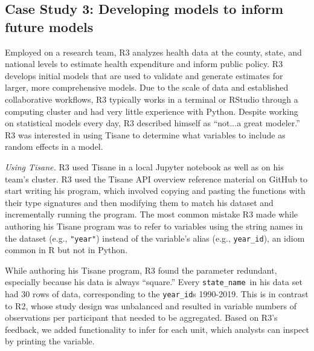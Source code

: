 \subsection{Case Study 3: Developing models to inform future models}
Employed on a research team, R3 analyzes health data at the county, state,
and national levels to estimate health expenditure and inform public policy. R3
develops initial models that are used to validate and generate estimates for
larger, more comprehensive models.
Due to the
scale of data and established collaborative workflows, R3 typically works in a
terminal or RStudio through a computing cluster and had very little experience
with Python. Despite working on statistical models every day, R3 described himself as
``not...a great modeler.''
R3 was interested in using Tisane to
determine what variables to include as random effects in a model.

\def\statename{\texttt{state\_name}\xspace}
\def\yearid{\texttt{year\_id}\xspace}
\def\cardinality{\texttt{cardinality}\xspace}

\textit{Using Tisane.} R3 used Tisane in a local Jupyter notebook as well as on
his team's cluster. R3 used the Tisane API overview reference material on GitHub
to start writing his program, which involved copying and pasting the functions
with their type signatures and then modifying them to match his dataset and
incrementally running the program. The most common mistake R3 made while
authoring his Tisane program was to refer to variables using the string names in
the dataset (e.g., \texttt{"year"}) instead of the variable's alias (e.g.,
\yearid), an idiom common in R but not in Python.

While authoring his Tisane program, R3 found the \numberofinstances parameter
redundant, especially because his data is always ``square.'' Every \statename\
in his data set had 30 rows of data, corresponding to the \yearid{}s 1990-2019.
This is in contrast to R2, whose study design was unbalanced and resulted in
variable numbers of observations per participant that needed to be aggregated. Based on R3's feedback, we
added functionality to infer \numberofinstances for each unit, which analysts can inspect by
printing the variable.

